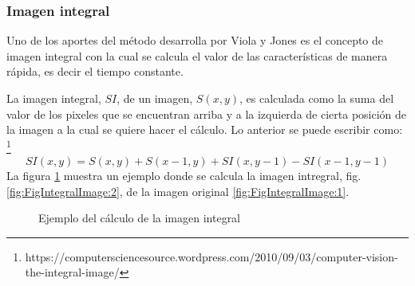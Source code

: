 \subsubsection{Imagen integral}\label{sssec:IntegralImage} 

Uno de los aportes del método desarrolla por Viola y Jones es el concepto de imagen integral con la cual se calcula el valor de las características de manera rápida, es decir el tiempo constante. 

La imagen integral, $SI$, de un imagen, $S(x,y)$, es calculada como la suma del valor de los pixeles que se encuentran arriba y a la izquierda de cierta posición de la imagen a la cual se quiere hacer el cálculo. Lo anterior se puede escribir como: \footnote{https://computersciencesource.wordpress.com/2010/09/03/computer-vision-the-integral-image/}     
$$SI(x,y)=S(x,y) + S(x-1,y) + SI(x,y-1)-SI(x-1,y-1)$$ 
La figura \ref{fig:FigIntegralImage} muestra un  ejemplo donde se calcula la imagen intregral, fig. \ref{fig:FigIntegralImage:2}, de la imagen original \ref{fig:FigIntegralImage:1}.
\begin{figure}[h!]
\centering
{} \qquad
{}
\caption{Ejemplo del cálculo de la imagen integral} \label{fig:FigIntegralImage}
\end{figure}

